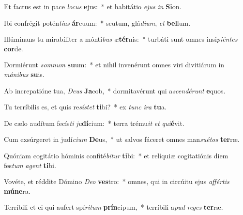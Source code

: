 \item Et factus est in pace \textit{lo}\textit{cus} \textbf{e}jus:~* et habitátio \textit{e}\textit{jus} \textit{in} \textbf{Si}on.
\item Ibi confrégit potén\textit{ti}\textit{as} \textbf{ár}cuum:~* scutum, glá\textit{di}\textit{um}, \textit{et} \textbf{bel}lum.
\item Illúminans tu mirabíliter a mónti\textit{bus} \textit{æ}\textbf{tér}nis:~* turbáti sunt omnes insi\textit{pi}\textit{én}\textit{tes} \textbf{cor}de.
\item Dormiérunt \textit{som}\textit{num} \textbf{su}um:~* et nihil invenérunt omnes viri divitiárum in \textit{má}\textit{ni}\textit{bus} \textbf{su}is.
\item Ab increpatióne tua, \textit{De}\textit{us} \textbf{Ja}cob,~* dormitavérunt qui a\textit{scen}\textit{dé}\textit{runt} \textbf{e}quos.
\item Tu terríbilis es, et quis re\textit{sís}\textit{tet} \textbf{ti}bi?~* ex \textit{tunc} \textit{i}\textit{ra} \textbf{tu}a.
\item De cælo audítum fecís\textit{ti} \textit{ju}\textbf{dí}cium:~* terra trému\textit{it} \textit{et} \textit{qui}\textbf{é}vit.
\item Cum exsúrgeret in judí\textit{ci}\textit{um} \textbf{De}us,~* ut salvos fáceret omnes man\textit{su}\textit{é}\textit{tos} \textbf{ter}ræ.
\item Quóniam cogitátio hóminis confité\textit{bi}\textit{tur} \textbf{ti}bi:~* et relíquiæ cogitatiónis diem fes\textit{tum} \textit{a}\textit{gent} \textbf{ti}bi.
\item Vovéte, et réddite Dómino \textit{De}\textit{o} \textbf{ves}tro:~* omnes, qui in circúitu ejus \textit{af}\textit{fér}\textit{tis} \textbf{mú}\textbf{ne}ra.
\item Terríbili et ei qui aufert spí\textit{ri}\textit{tum} \textbf{prín}cipum,~* terríbili a\textit{pud} \textit{re}\textit{ges} \textbf{ter}ræ.
